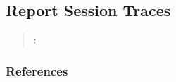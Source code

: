 



\subsection{Report Session Traces}
\label{sec:report-session-traces}

\begin{quote}
\summary: 
\end{quote}



\subsubsection{References}





